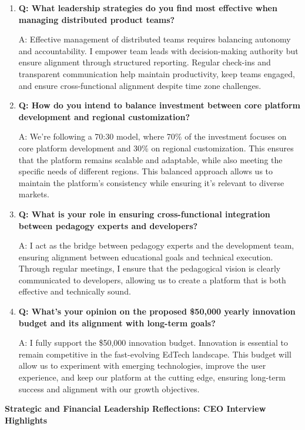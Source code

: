 \documentclass[12pt,a4paper,oneside]{book}
\begin{document}
\begin{enumerate}
\item \textbf{Q: What leadership strategies do you find most effective when managing distributed product teams?}

A: Effective management of distributed teams requires balancing autonomy and accountability. I empower team leads with decision-making authority but ensure alignment through structured reporting. Regular check-ins and transparent communication help maintain productivity, keep teams engaged, and ensure cross-functional alignment despite time zone challenges.

\item \textbf{Q: How do you intend to balance investment between core platform development and regional customization?}

A: We’re following a 70:30 model, where 70\% of the investment focuses on core platform development and 30\% on regional customization. This ensures that the platform remains scalable and adaptable, while also meeting the specific needs of different regions. This balanced approach allows us to maintain the platform’s consistency while ensuring it’s relevant to diverse markets.

\item \textbf{Q: What is your role in ensuring cross-functional integration between pedagogy experts and developers?}

A: I act as the bridge between pedagogy experts and the development team, ensuring alignment between educational goals and technical execution. Through regular meetings, I ensure that the pedagogical vision is clearly communicated to developers, allowing us to create a platform that is both effective and technically sound.

\item \textbf{Q: What’s your opinion on the proposed \$50,000 yearly innovation budget and its alignment with long-term goals?}

A: I fully support the \$50,000 innovation budget. Innovation is essential to remain competitive in the fast-evolving EdTech landscape. This budget will allow us to experiment with emerging technologies, improve the user experience, and keep our platform at the cutting edge, ensuring long-term success and alignment with our growth objectives.


\end{enumerate}

  \textbf{Strategic and Financial Leadership Reflections: CEO Interview Highlights}
\end{document}

